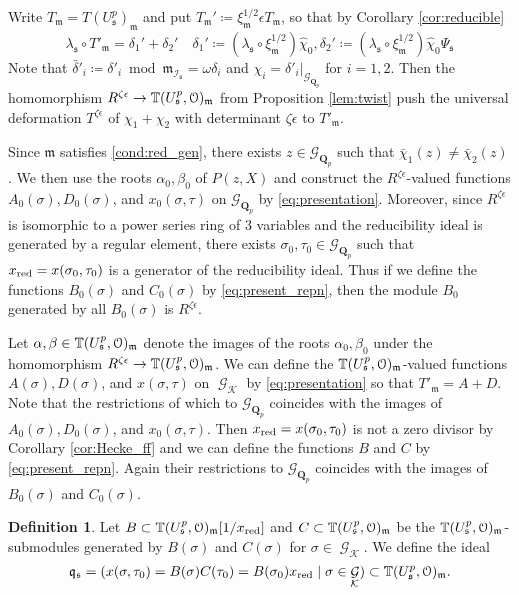 \documentclass[leqno]{amsart}
\theoremstyle{definition}
\newtheorem{defn}[thm]{Definition}
\theoremstyle{remark}
\newcommand{\eo}{\EuScript{O}}
\newcommand{\Qp}{\mathbf{Q}_p}
\DeclareMathOperator{\Gal}{\mathcal{G}}
\newcommand{\fm}{\mathfrak{m}}
\newcommand{\fq}{\mathfrak{q}}
\newcommand{\fs}{\mathfrak{s}}
\newcommand{\Gp}{\mathcal{G}_{\Qp}} %
\newcommand{\xx}{x_\textnormal{red}}
\newcommand{\K}{{\mathcal{K}}} %
\newcommand{\TT}{\mathbb{T}} %
\newcommand{\I}{\mathcal{I}} %
\begin{document}
Write $T_\fm=T(U^p_\fs)_\fm$ and put
$T_\fm'\coloneqq \xi_\fm^{1/2}\epsilon T_\fm$, so that
by Corollary \ref{cor:reducible}
\[
    \lambda_\fs\circ T'_\fm=
    \delta_1'+\delta_2'\quad
    \delta_1'\coloneqq 
    (\lambda_\fs\circ\xi_\fm^{1/2})\hat{\chi}_0,
    \delta_2'\coloneqq 
    (\lambda_\fs\circ\xi_\fm^{1/2})\hat{\chi}_0\Psi_\fs
\]
Note that $\bar{\delta}'_i\coloneqq\delta'_i\bmod \fm_{\I_\fs}
=\omega\delta_i$ and $\chi_i=\delta'_i\vert_{\Gp}$ for $i=1,2$.
Then the homomorphism 
$R^{\zeta\epsilon}\to \TT(U^p_\fs,\eo)_\fm$
from Proposition \ref{lem:twist}
push the universal deformation $T^{\zeta\epsilon}$
of $\chi_1+\chi_2$ with determinant $\zeta\epsilon$
to $T'_\fm$.

Since $\fm$ satisfies \eqref{cond:red_gen},
there exists $z\in\Gp$ such that 
$\bar{\chi}_1(z)\neq\bar{\chi}_2(z)$.
We then use the roots $\alpha_0,\beta_0$ of $P(z,X)$
and construct the $R^{\zeta\epsilon}$-valued functions
$A_0(\sigma),D_0(\sigma)$, and $x_0(\sigma,\tau)$ 
on $\Gp$ by \eqref{eq:presentation}.
Moreover, since $R^{\zeta\epsilon}$
is isomorphic to a power series ring of 3 variables
and the reducibility ideal is generated by a regular element,
there exists $\sigma_0,\tau_0\in\Gp$ such that
$\xx=x(\sigma_0,\tau_0)$ is a 
generator of the reducibility ideal.
Thus if we define the functions $B_0(\sigma)$ and $C_0(\sigma)$ 
by \eqref{eq:present_repn},
then the module $B_0$ generated by all $B_0(\sigma)$
is $R^{\zeta\epsilon}$.



Let $\alpha,\beta\in \TT(U^p_\fs,\eo)_\fm$
denote the images of the roots $\alpha_0,\beta_0$
under the homomorphism $R^{\zeta\epsilon}\to \TT(U^p_\fs,\eo)_\fm$.
We can define the $\TT(U^p_\fs,\eo)_\fm$-valued functions
$A(\sigma), D(\sigma)$, and $x(\sigma,\tau)$ on $\Gal_\K$
by \eqref{eq:presentation} so that $T'_\fm=A+D$.
Note that the restrictions of which to 
$\Gp$ coincides with the images of 
$A_0(\sigma), D_0(\sigma)$, and $x_0(\sigma,\tau)$.
Then $\xx=x(\sigma_0,\tau_0)$ is not a zero divisor
by Corollary \ref{cor:Hecke_ff} and we can define
the functions $B$ and $C$ by \eqref{eq:present_repn}.
Again their restrictions to $\Gp$ coincides with 
the images of $B_0(\sigma)$ and $C_0(\sigma)$.

\begin{defn}\label{def:fq_ideal}
Let $B\subset\TT(U^p_\fs,\eo)_\fm[1/\xx]$
and $C\subset\TT(U^p_\fs,\eo)_\fm$
be the $\TT(U^p_\fs,\eo)_\fm$-submodules
generated by $B(\sigma)$ and $C(\sigma)$ 
for $\sigma\in\Gal_\K$. We define the ideal
\[
    \fq_\fs=(x(\sigma,\tau_0)=B(\sigma)C(\tau_0)=B(\sigma_0)\xx
    \mid\sigma\in\Gal_\K)\subset \TT(U^p_\fs,\eo)_\fm.
\]
\end{defn}
\end{document}
